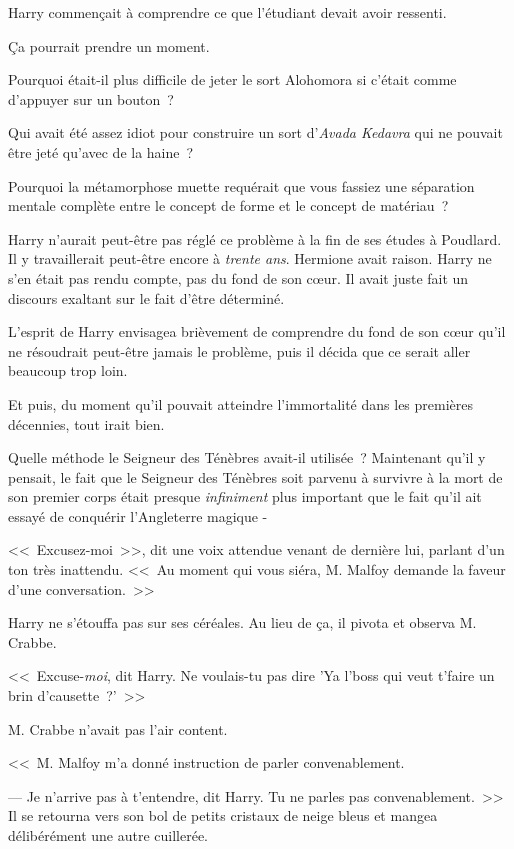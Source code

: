 Harry commençait à comprendre ce que l'étudiant devait avoir ressenti.

Ça pourrait prendre un moment.

Pourquoi était-il plus difficile de jeter le sort Alohomora si c'était comme d'appuyer sur un bouton~?

Qui avait été assez idiot pour construire un sort d'\emph{Avada Kedavra} qui ne pouvait être jeté qu'avec de la haine~?

Pourquoi la métamorphose muette requérait que vous fassiez une séparation mentale complète entre le concept de forme et le concept de matériau~?

Harry n'aurait peut-être pas réglé ce problème à la fin de ses études à Poudlard. Il y travaillerait peut-être encore à \emph{trente ans}. Hermione avait raison. Harry ne s'en était pas rendu compte, pas du fond de son cœur. Il avait juste fait un discours exaltant sur le fait d'être déterminé.

L'esprit de Harry envisagea brièvement de comprendre du fond de son cœur qu'il ne résoudrait peut-être jamais le problème, puis il décida que ce serait aller beaucoup trop loin.

Et puis, du moment qu'il pouvait atteindre l'immortalité dans les premières décennies, tout irait bien.

Quelle méthode le Seigneur des Ténèbres avait-il utilisée~? Maintenant qu'il y pensait, le fait que le Seigneur des Ténèbres soit parvenu à survivre à la mort de son premier corps était presque \emph{infiniment} plus important que le fait qu'il ait essayé de conquérir l'Angleterre magique -

<<~Excusez-moi~>>, dit une voix attendue venant de dernière lui, parlant d'un ton très inattendu. <<~Au moment qui vous siéra, M. Malfoy demande la faveur d'une conversation.~>>

Harry ne s'étouffa pas sur ses céréales. Au lieu de ça, il pivota et observa M. Crabbe.

<<~Excuse-\emph{moi}, dit Harry. Ne voulais-tu pas dire 'Ya l'boss qui veut t'faire un brin d'causette~?'~>>

M. Crabbe n'avait pas l'air content.

<<~M. Malfoy m'a donné instruction de parler convenablement.

--- Je n'arrive pas à t'entendre, dit Harry. Tu ne parles pas convenablement.~>> Il se retourna vers son bol de petits cristaux de neige bleus et mangea délibérément une autre cuillerée.

